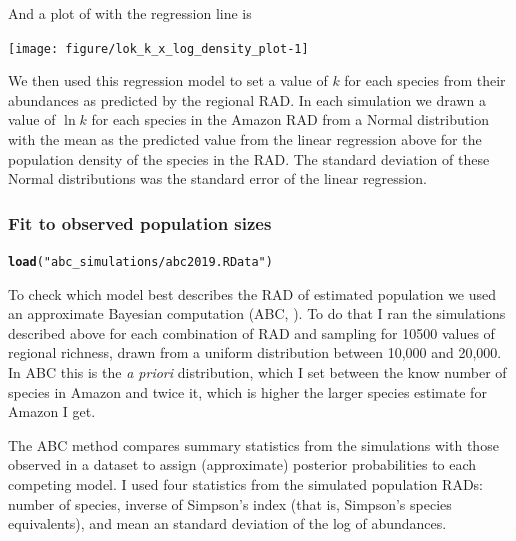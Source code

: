 \documentclass[12pt, A4]{article}\usepackage[]{graphicx}\usepackage[]{color}
\makeatletter
\newcommand{\hlstr}[1]{\textcolor[rgb]{0.192,0.494,0.8}{#1}}%
\newcommand{\hlstd}[1]{\textcolor[rgb]{0.345,0.345,0.345}{#1}}%
\newcommand{\hlkwd}[1]{\textcolor[rgb]{0.737,0.353,0.396}{\textbf{#1}}}%
\newenvironment{kframe}{%
 \def\at@end@of@kframe{}%
 \ifinner\ifhmode%
  \def\at@end@of@kframe{\end{minipage}}%
  \begin{minipage}{\columnwidth}%
 \fi\fi%
 \def\FrameCommand##1{\hskip\@totalleftmargin \hskip-\fboxsep
 \colorbox{shadecolor}{##1}\hskip-\fboxsep
     \hskip-\linewidth \hskip-\@totalleftmargin \hskip\columnwidth}%
 \MakeFramed {\advance\hsize-\width
   \@totalleftmargin\z@ \linewidth\hsize
   \@setminipage}}%
 {\par\unskip\endMakeFramed%
 \at@end@of@kframe}
\newenvironment{knitrout}{}{} %
\makeatother
\begin{document}
And a plot of with the regression line is

\begin{knitrout}
\color{fgcolor}

{\centering \texttt{[image: figure/lok\_k\_x\_log\_density\_plot-1]} 

}



\end{knitrout}

We then used this regression model to set a value of $k$ for each species from
their abundances as predicted by the regional RAD. 
In each simulation we drawn a value of $\ln k$ for each species
in the Amazon RAD from a Normal distribution with the mean as
the predicted value from the linear regression above for the population
density of the species in the RAD. The standard deviation of these
Normal distributions was the standard error of the linear regression.

\subsubsection*{Fit to observed population sizes}
\label{sec:fit-observ-popul}

\begin{knitrout}
\color{fgcolor}\begin{kframe}
\begin{alltt}
\hlkwd{load}\hlstd{(}\hlstr{"abc_simulations/abc2019.RData"}\hlstd{)}
\end{alltt}
\end{kframe}
\end{knitrout}

To check which model best describes the RAD of estimated population we
used an approximate Bayesian computation (ABC, \citet{csillery2010,csillery2012}). 
To do that I ran 
the simulations described above for each combination of RAD and sampling
for 10500 values of regional richness, drawn from a uniform
distribution between 10,000 and 20,000. In ABC this is the \emph{a priori}
distribution, which I set between the know number of species in Amazon and
twice it, which is higher the larger species estimate for Amazon I get.

The ABC method compares summary statistics from the simulations with those observed
in a dataset to assign (approximate) posterior probabilities to each competing model.
I used four statistics from the simulated population RADs: number of species, inverse of Simpson's index
(that is, Simpson's species equivalents), and mean an standard deviation of the log of abundances.
\end{document}
